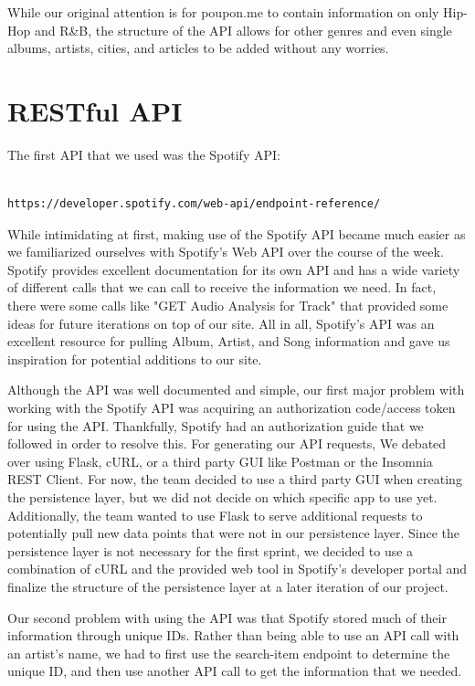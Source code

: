 \documentclass{scrartcl}
\begin{document}
    While our original attention is for poupon.me to contain information on only Hip-Hop and R\&B, the structure of the API allows for other genres and even single albums, artists, cities, and articles to be added without any worries.

    \section{RESTful API}\label{sec:restfulApi}
    The first API that we used was the Spotify API: \begin{verbatim}
                                                        https://developer.spotify.com/web-api/endpoint-reference/
    \end{verbatim}

    While intimidating at first, making use of the Spotify API became much easier as we familiarized ourselves with Spotify's Web API over the course of the week.
    Spotify provides excellent documentation for its own API and has a wide variety of different calls that we can call to receive the information we need.
    In fact, there were some calls like "GET Audio Analysis for Track" that provided some ideas for future iterations on top of our site.
    All in all, Spotify's API was an excellent resource for pulling Album, Artist, and Song information and gave us inspiration for potential additions to our site.

    Although the API was well documented and simple, our first major problem with working with the Spotify API was acquiring an authorization code/access token for using the API.
    Thankfully, Spotify had an authorization guide that we followed in order to resolve this.
    For generating our API requests, We debated over using Flask, cURL, or a third party GUI like Postman or the Insomnia REST Client.
    For now, the team decided to use a third party GUI when creating the persistence layer, but we did not decide on which specific app to use yet.
    Additionally, the team wanted to use Flask to serve additional requests to potentially pull new data points that were not in our persistence layer.
    Since the persistence layer is not necessary for the first sprint, we decided to use a combination of cURL and the provided web tool in Spotify's developer portal and finalize the structure of the persistence layer at a later iteration of our project.

    Our second problem with using the API was that Spotify stored much of their information through unique IDs.
    Rather than being able to use an API call with an artist's name, we had to first use the search-item endpoint to determine the unique ID, and then use another API call to get the information that we needed.
\end{document}
